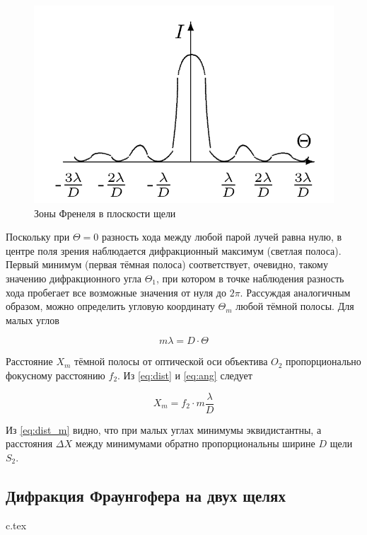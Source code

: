 \documentclass[a5paper,10pt, twoside]{article} %
\begin{document}
	\begin{figure} %
		\label{img:dist}
		\includegraphics[width=\linewidth]{dist.png}
		\caption{Зоны Френеля в	плоскости щели}
	\end{figure}

	Поскольку при $\Theta = 0$ разность хода между любой парой лучей равна нулю, в центре поля зрения
	наблюдается дифракционный максимум (светлая полоса). Первый минимум (первая тёмная полоса) 
	соответствует, очевидно, такому значению дифракционного угла $\Theta_1$, при котором
	в точке наблюдения разность хода пробегает все возможные значения от нуля до $2 \pi$.
	Рассуждая аналогичным образом, можно определить угловую координату $\Theta_m$
	любой тёмной полосы. Для малых углов

	\begin{equation}\label{eq:ang}
		m \lambda = D \cdot \Theta
	\end{equation}

	Расстояние $X_m$ тёмной полосы от оптической оси объектива $O_2$ пропорционально фокусному
	расстоянию $f_2$. Из \eqref{eq:dist} и \eqref{eq:ang} следует

	\begin{equation}\label{eq:dist_m}
		X_m = f_2 \cdot m \frac{\lambda}{D}
	\end{equation}

	Из \eqref{eq:dist_m} видно, что при малых углах минимумы эквидистантны, а расстояния $\Delta X$
	между минимумами обратно пропорциональны ширине $D$ щели $S_2$.

\subsection{Дифракция Фраунгофера на двух щелях}
    {c.tex}
\end{document}

